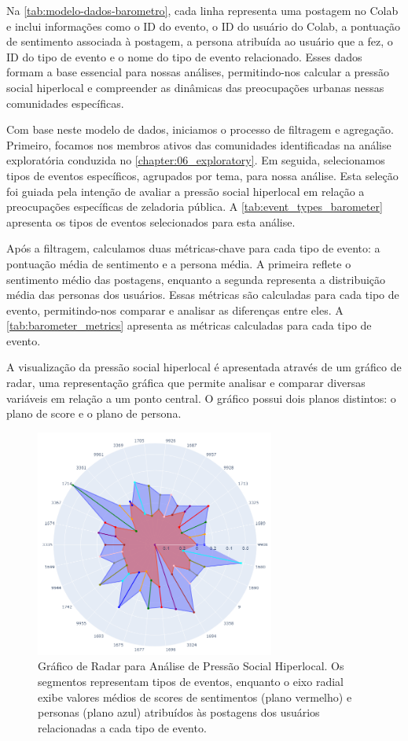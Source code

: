 Na \autoref{tab:modelo-dados-barometro}, cada linha representa uma postagem no Colab e inclui informações como o ID do evento, o ID do usuário do Colab, a pontuação de sentimento associada à postagem, a persona atribuída ao usuário que a fez, o ID do tipo de evento e o nome do tipo de evento relacionado. Esses dados formam a base essencial para nossas análises, permitindo-nos calcular a pressão social hiperlocal e compreender as dinâmicas das preocupações urbanas nessas comunidades específicas.

Com base neste modelo de dados, iniciamos o processo de filtragem e agregação. Primeiro, focamos nos membros ativos das comunidades identificadas na análise exploratória conduzida no \autoref{chapter:06_exploratory}. Em seguida, selecionamos tipos de eventos específicos, agrupados por tema, para nossa análise. Esta seleção foi guiada pela intenção de avaliar a pressão social hiperlocal em relação a preocupações específicas de zeladoria pública. A \autoref{tab:event_types_barometer} apresenta os tipos de eventos selecionados para esta análise.

Após a filtragem, calculamos duas métricas-chave para cada tipo de evento: a pontuação média de sentimento e a persona média. A primeira reflete o sentimento médio das postagens, enquanto a segunda representa a distribuição média das personas dos usuários. Essas métricas são calculadas para cada tipo de evento, permitindo-nos comparar e analisar as diferenças entre eles. A \autoref{tab:barometer_metrics} apresenta as métricas calculadas para cada tipo de evento.

A visualização da pressão social hiperlocal é apresentada através de um gráfico de radar, uma representação gráfica que permite analisar e comparar diversas variáveis em relação a um ponto central. O gráfico possui dois planos distintos: o plano de score e o plano de persona.

\begin{figure}[htb]
	\centering
	\includegraphics[width=0.7\textwidth]{images/social_barometer_plot.png}
	\caption{Gráfico de Radar para Análise de Pressão Social Hiperlocal. Os segmentos representam tipos de eventos, enquanto o eixo radial exibe valores médios de scores de sentimentos (plano vermelho) e personas (plano azul) atribuídos às postagens dos usuários relacionadas a cada tipo de evento.}
	\label{fig:social_barometer_plot}
\end{figure}

